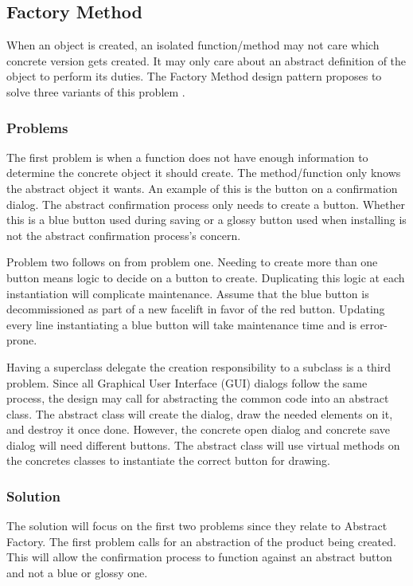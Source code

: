 \subsection{Factory Method}
When an object is created, an isolated function/method may not care which concrete version gets created.
It may only care about an abstract definition of the object to perform its duties.
The Factory Method design pattern proposes to solve three variants of this problem \cite{gamma_94_01}.

\subsubsection{Problems}
\label{sec:factory-method-problems}
The first problem is when a function does not have enough information to determine the concrete object it should create.
The method/function only knows the abstract object it wants.
An example of this is the button on a confirmation dialog.
The abstract confirmation process only needs to create a button.
Whether this is a blue button used during saving or a glossy button used when installing is not the abstract confirmation process's concern.

Problem two follows on from problem one.
Needing to create more than one button means logic to decide on a button to create.
Duplicating this logic at each instantiation will complicate maintenance.
Assume that the blue button is decommissioned as part of a new facelift in favor of the red button.
Updating every line instantiating a blue button will take maintenance time and is error-prone.

Having a superclass delegate the creation responsibility to a subclass is a third problem.
Since all Graphical User Interface (GUI) dialogs follow the same process, the design may call for abstracting the common code into an abstract class.
The abstract class will create the dialog, draw the needed elements on it, and destroy it once done.
However, the concrete open dialog and concrete save dialog will need different buttons.
The abstract class will use virtual methods on the concretes classes to instantiate the correct button for drawing.

\subsubsection{Solution}
The solution will focus on the first two problems since they relate to Abstract Factory.
The first problem calls for an abstraction of the product being created.
This will allow the confirmation process to function against an abstract button and not a blue or glossy one.


